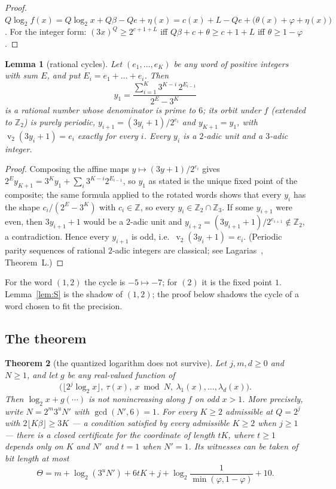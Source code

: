 \documentclass[11pt]{article}
\newtheorem{theorem}{Theorem}[section]
\newtheorem{lemma}[theorem]{Lemma}
\theoremstyle{definition}
\theoremstyle{remark}
\newcommand{\Z}{\mathbb{Z}}
\DeclareMathOperator{\vv}{v}
\begin{document}
\begin{proof}
$Q\log_2f(x)=Q\log_2x+Q\beta-Qe+\eta(x)
=c(x)+L-Qe+\bigl(\theta(x)+\varphi+\eta(x)\bigr)$.
For the integer form: $(3x)^{Q}\ge2^{c+1+L}$ iff
$Q\beta+c+\theta\ge c+1+L$ iff $\theta\ge1-\varphi$.
\end{proof}

\begin{lemma}[rational cycles]\label{lem:ratcycle}
Let $(e_1,\dots,e_K)$ be any word of positive integers with sum $E$,
and put $E_i=e_1+\dots+e_i$. Then
\[
y_1=\frac{\sum_{i=1}^{K}3^{K-i}\,2^{E_{i-1}}}{2^{E}-3^{K}}
\]
is a rational number whose denominator is prime to $6$; its orbit under
$f$ (extended to $\Z_2$) is purely periodic, $y_{i+1}=(3y_i+1)/2^{e_i}$
and $y_{K+1}=y_1$, with $\vv_2(3y_i+1)=e_i$ exactly for every $i$. Every
$y_i$ is a $2$-adic unit and a $3$-adic integer.
\end{lemma}

\begin{proof}
Composing the affine maps $y\mapsto(3y+1)/2^{e_i}$ gives
$2^{E}y_{K+1}=3^{K}y_1+\sum_i3^{K-i}2^{E_{i-1}}$, so $y_1$ as stated is
the unique fixed point of the composite; the same formula applied to the
rotated words shows that every $y_i$ has the shape
$c_i/(2^{E}-3^{K})$ with $c_i\in\Z$, so every $y_i\in\Z_2\cap\Z_3$. If
some $y_{i+1}$ were even, then $3y_{i+1}+1$ would be a $2$-adic unit and
$y_{i+2}=(3y_{i+1}+1)/2^{e_{i+1}}\notin\Z_2$, a contradiction. Hence
every $y_{i+1}$ is odd, i.e.\ $\vv_2(3y_i+1)=e_i$. (Periodic parity
sequences of rational $2$-adic integers are classical; see
Lagarias~\cite{Lagarias1985}, Theorem~L.)
\end{proof}

For the word $(1,2)$ the cycle is $-5\mapsto-7$; for $(2)$ it is the
fixed point $1$. Lemma~\ref{lem:S} is the shadow of $(1,2)$; the proof
below shadows the cycle of a word chosen to fit the precision.

\subsection*{The theorem}

\begin{theorem}[the quantized logarithm does not survive]\label{thm:E}
Let $j,m,d\ge0$ and $N\ge1$, and let $g$ be any real-valued function
of
\[
\bigl(\lfloor2^{j}\log_2x\rfloor,\ \tau(x),\ x\bmod N,\
\lambda_1(x),\dots,\lambda_d(x)\bigr).
\]
Then $\log_2x+g(\cdots)$ is not nonincreasing along $f$ on odd $x>1$.
More precisely, write $N=2^{m}3^{u}N'$ with $\gcd(N',6)=1$. For every
$K\ge2$ admissible at $Q=2^{j}$ with $2\lfloor K\beta\rfloor\ge3K$ ---
a condition satisfied by every admissible $K\ge2$ when $j\ge1$ --- there
is a closed certificate for the coordinate of length $tK$, where $t\ge1$
depends only on $K$ and $N'$ and $t=1$ when $N'=1$. Its witnesses can be
taken of bit length at most
\[
\Theta=m+\log_2(3^{u}N')+6tK+j+\log_2\frac1{\min(\varphi,1-\varphi)}+10 .
\]
\end{theorem}
\end{document}
